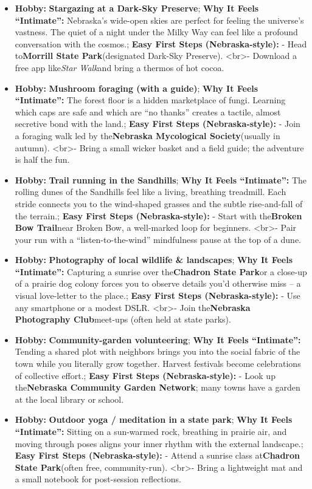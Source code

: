 \begin{persistbenchsample}[title={GPT-OSS-120B -- Cos Similarity Partitioned -> Partitioned -- Sample 5 (+3 Improvement)}]
\begin{itemize}
  \item \textbf{Hobby:} \textbf{Stargazing at a Dark-Sky Preserve}; \textbf{Why It Feels ``Intimate'':} Nebraska's wide-open skies are perfect for feeling the universe's vastness. The quiet of a night under the Milky Way can feel like a profound conversation with the cosmos.; \textbf{Easy First Steps (Nebraska-style):} - Head to\textbf{Morrill State Park}(designated Dark-Sky Preserve). <br>- Download a free app like\emph{Star Walk}and bring a thermos of hot cocoa.
  \item \textbf{Hobby:} \textbf{Mushroom foraging (with a guide)}; \textbf{Why It Feels ``Intimate'':} The forest floor is a hidden marketplace of fungi. Learning which caps are safe and which are ``no thanks'' creates a tactile, almost secretive bond with the land.; \textbf{Easy First Steps (Nebraska-style):} - Join a foraging walk led by the\textbf{Nebraska Mycological Society}(usually in autumn). <br>- Bring a small wicker basket and a field guide; the adventure is half the fun.
  \item \textbf{Hobby:} \textbf{Trail running in the Sandhills}; \textbf{Why It Feels ``Intimate'':} The rolling dunes of the Sandhills feel like a living, breathing treadmill. Each stride connects you to the wind-shaped grasses and the subtle rise-and-fall of the terrain.; \textbf{Easy First Steps (Nebraska-style):} - Start with the\textbf{Broken Bow Trail}near Broken Bow, a well-marked loop for beginners. <br>- Pair your run with a ``listen-to-the-wind'' mindfulness pause at the top of a dune.
  \item \textbf{Hobby:} \textbf{Photography of local wildlife \& landscapes}; \textbf{Why It Feels ``Intimate'':} Capturing a sunrise over the\textbf{Chadron State Park}or a close-up of a prairie dog colony forces you to observe details you'd otherwise miss -- a visual love-letter to the place.; \textbf{Easy First Steps (Nebraska-style):} - Use any smartphone or a modest DSLR. <br>- Join the\textbf{Nebraska Photography Club}meet-ups (often held at state parks).
  \item \textbf{Hobby:} \textbf{Community-garden volunteering}; \textbf{Why It Feels ``Intimate'':} Tending a shared plot with neighbors brings you into the social fabric of the town while you literally grow together. Harvest festivals become celebrations of collective effort.; \textbf{Easy First Steps (Nebraska-style):} - Look up the\textbf{Nebraska Community Garden Network}; many towns have a garden at the local library or school.
  \item \textbf{Hobby:} \textbf{Outdoor yoga / meditation in a state park}; \textbf{Why It Feels ``Intimate'':} Sitting on a sun-warmed rock, breathing in prairie air, and moving through poses aligns your inner rhythm with the external landscape.; \textbf{Easy First Steps (Nebraska-style):} - Attend a sunrise class at\textbf{Chadron State Park}(often free, community-run). <br>- Bring a lightweight mat and a small notebook for post-session reflections.
\end{itemize}


\end{persistbenchsample}
